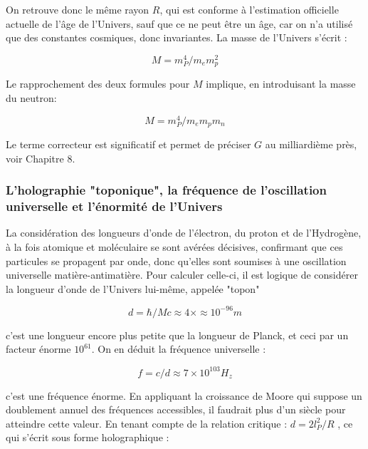\documentclass[a4paper,12pt]{article}
\begin{document}
On retrouve donc le même rayon $R$, qui est conforme à l'estimation officielle actuelle de l'âge de l'Univers, sauf que ce ne peut être un âge, car on n'a utilisé que des constantes cosmiques, donc invariantes. La masse de l'Univers s'écrit :

\begin{equation}
M = m_P^4/m_em_p^2
\end{equation}

Le rapprochement des deux formules pour $M$ implique, en introduisant la masse du neutron:

\begin{equation}
M = m_P^4/m_em_pm_n
\end{equation}

 
Le terme correcteur est significatif et permet de préciser $G$ au milliardième près, voir Chapitre 8.
 


\subsubsection {L'holographie "toponique", la fréquence de l'oscillation universelle et l'énormité de l'Univers}

       La considération des longueurs d'onde de l'électron, du proton et de l'Hydrogène, à la fois atomique et moléculaire se sont avérées décisives, confirmant que ces particules se propagent par onde, donc qu'elles sont soumises à une oscillation universelle matière-antimatière. Pour calculer celle-ci, il est logique de considérer la longueur d'onde de l'Univers lui-même, appelée "topon" 


\begin{equation}
d = \hbar/Mc  \approx 4\times \approx 10^{-96} m 
\end{equation}


c'est une longueur encore plus petite que la longueur de Planck, et ceci par un facteur énorme $10^{61}$. On en déduit la fréquence universelle : 


\begin{equation}
f = c/d \approx  7 \times 10^{103} H_z
\end{equation}

c'est une fréquence énorme. En appliquant la croissance de Moore qui suppose un doublement annuel des fréquences accessibles, il faudrait plus d'un siècle pour atteindre cette valeur.
     En tenant compte de la relation critique : $d = 2l_P^2/R$ , ce qui s'écrit sous forme holographique :
\end{document}
